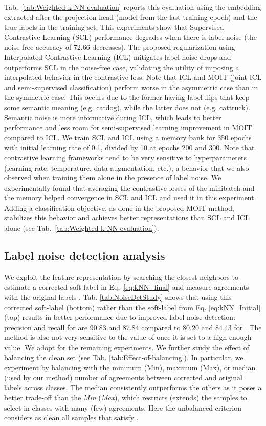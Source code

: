 \documentclass[final]{cvpr}
\begin{document}
Tab.~\ref{tab:Weighted-k-NN-evaluation} reports this evaluation using the embedding  extracted after the projection head (model from the last training epoch) and the true labels in the training set. This experiments show that Supervised Contrastive Learning (SCL) \cite{2020_arXiv_SupContLearn} performance degrades when there is label noise (the noise-free accuracy of 72.66 decreases). The proposed regularization using Interpolated Contrastive Learning (ICL) mitigates label noise drops and outperforms SCL in the noise-free case, validating the utility of imposing a interpolated behavior in the contrastive loss. Note that ICL and MOIT (joint ICL and semi-supervised classification) perform worse in the asymmetric case than in the symmetric case. This occurs due to the former having label flips that keep some semantic meaning (e.g. catdog), while the latter does not (e.g. cattruck). Semantic noise is more informative during ICL, which leads to better performance and less room for semi-supervised learning improvement in MOIT compared to ICL.
We train SCL and ICL using a memory bank for 350 epochs with initial learning rate of 0.1, divided by 10 at epochs 200 and 300. Note that contrastive
learning frameworks tend to be very sensitive to hyperparameters \cite{2020_ICML_SimCLR,2020_CVPR_MoCo,2020_arXiv_SupContLearn}
(learning rate, temperature, data augmentation, etc.), a behavior that we also observed when training them alone in the presence of label noise. We experimentally found that averaging the contrastive losses of the minibatch  and the memory  helped convergence in SCL and ICL and used it in this experiment. Adding a classification objective, as done in the proposed MOIT method, stabilizes this behavior and achieves better representations than SCL and ICL alone (see Tab.~\ref{tab:Weighted-k-NN-evaluation}).

\subsection{Label noise detection analysis\label{subsec:Joint-training-hyperparameters}}

We exploit the feature representation  by searching the closest  neighbors to estimate a corrected soft-label  in Eq.~\ref{eq:kNN_final} and measure agreements with the original labels . Tab. \ref{tab:NoiseDetStudy} shows that using this corrected soft-label  (bottom) rather than the soft-label  from Eq. \ref{eq:kNN_Initial} (top) results in better performance due to improved label noise detection: precision and  recall for  are 90.83 and 87.84 compared to 80.20 and 84.43 for . The method is also not very sensitive to the value of  once it is set to a high enough value. We adopt  for the remaining experiments. We further study the effect of balancing the clean set  (see Tab. \ref{tab:Effect-of-balancing}). In particular, we experiment by balancing with the minimum (Min), maximum (Max), or median (used by our method) number of agreements between corrected  and original  labels across classes. The median consistently outperforms the others as it poses a better trade-off than the \emph{Min} (\emph{Max}), which restricts (extends) the samples to select in classes with many (few) agreements. Here the unbalanced criterion considers as clean all samples that satisfy .
\end{document}
